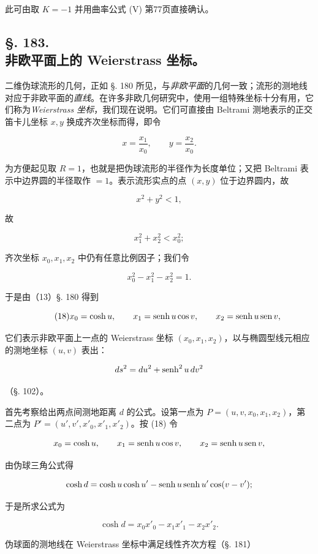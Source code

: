 此可由取 $K=-1$ 并用曲率公式 (V) 第77页直接确认。



\subsection*{§. 183.\\ 非欧平面上的 Weierstrass 坐标。}



二维伪球流形的几何，正如 §. 180 所见，与\emph{非欧平面}的几何一致；流形的测地线对应于非欧平面的\emph{直线}。在许多非欧几何研究中，使用一组特殊坐标十分有用，它们称为\emph{Weierstrass 坐标}，我们现在说明。它们可直接由 Beltrami 测地表示的正交笛卡儿坐标 $x,y$ 换成齐次坐标而得，即令

\[
 x=\frac{x_1}{x_0},\qquad y=\frac{x_2}{x_0}.
\]

为方便起见取 $R=1$，也就是把伪球流形的半径作为长度单位；又把 Beltrami 表示中边界圆的半径取作 \(=1\)。表示流形实点的点 \((x,y)\) 位于边界圆内，故

\[
 x^2+y^2<1,
\]

故

\[
 x_1^2+x_2^2<x_0^2;
\]

齐次坐标 \(x_0,x_1,x_2\) 中仍有任意比例因子；我们令

\[
\tag{17}
 x_0^2-x_1^2-x_2^2=1.
\]

于是由（13）§. 180 得到

\[
\tag{18}
 x_0=\cosh u,
 \qquad x_1=\operatorname{senh} u\cos v,
 \qquad x_2=\operatorname{senh} u\operatorname{sen} v,
\]

它们表示非欧平面上一点的 Weierstrass 坐标 \((x_0,x_1,x_2)\)，以与椭圆型线元相应的测地坐标 \((u,v)\) 表出：

\[
 ds^2=du^2+\operatorname{senh}^2 u\,dv^2
\]

（§. 102）。

首先考察给出两点间测地距离 \(d\) 的公式。设第一点为 \(P=(u,v,x_0,x_1,x_2)\)，第二点为 \(P'=(u',v',x'_0,x'_1,x'_2)\)。按 (18) 令

\[
 x_0=\cosh u,
 \qquad x_1=\operatorname{senh} u\cos v,
 \qquad x_2=\operatorname{senh} u\operatorname{sen} v,
\]

由伪球三角公式得

\[
 \cosh d=\cosh u\cosh u'-\operatorname{senh} u\operatorname{senh} u'\cos(v-v');
\]

于是所求公式为

\[
\tag{19}
 \cosh d=x_0x'_0-x_1x'_1-x_2x'_2.
\]

伪球面的测地线在 Weierstrass 坐标中满足线性齐次方程（§. 181）

